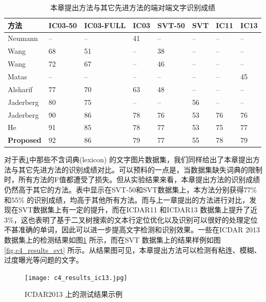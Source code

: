         \begin{table}[!h]
        \centering
        \caption{本章提出方法与其它先进方法的端对端文字识别成绩}
        \begin{tabular}{l|l l l l l l l}
        \hline
        方法 & IC03-50 & IC03-FULL & IC03 & SVT-50 & SVT & IC11 & IC13  \\
        \hline
        Neumann\cite{Neumann2010A} & -- & -- & 41 & -- & -- & -- & -- \\
        Wang\cite{Wang2012End} & 68 & 51 & -- & 38 & -- & -- & -- \\
        Wang\cite{Wang2012End} & 72 & 67 & -- & 46 & -- & -- & -- \\
        Matas\cite{Matas2014Scene} & -- & -- & -- & -- & -- & -- & 45 \\
        Alsharif\cite{Alsharif2013End} & 77 & 70 & 63 & 48 & -- & -- & -- \\
        Jaderberg\cite{Jaderberg2014Deep} & 80 & 75 & -- & -- & 56 & -- & -- \\
        Jaderberg\cite{Jaderberg2016Reading} & 90 & 86 & 78 & 76 & 53 & 76 & 76 \\
        He\cite{He2017scene} & 91 & 85 & 78 & 77 & 53 & 75 & 77 \\
        \textbf{Proposed} & 92 & 86 & 79 & 77 & 55 & 78 & 79 \\
        \hline
        \end{tabular}
        \label{tab.c4_recognition}
        \end{table}

        对于表\ref{tab.c4_recognition}中那些不含词典(lexicon) 的文字图片数据集，我们同样给出了本章提出方法与其它先进方法的识别成绩对比。可以预料的一点是，当数据集缺失词典的限制时，所有方法的F值都遭受了损失。但从实验结果来看，本章提出方法的识别成绩仍然高于其它的方法。表中显示在SVT-50和SVT数据集上，本方法分别获得77\%和55\% 的识别成绩，均高于其他所有方法。而与上一章提出的方法进行对比，发现在SVT数据集上有一定的提升，而在ICDAR11 和ICDAR13 数据集上提升了近3\%，这也表明了基于二叉树搜索的文本行定位优化以及识别可以很好的处理定位不甚准确的单词，因此可以进一步提高文字检测和识别效果。一些在ICDAR 2013数据集上的检测结果如图\ref{fig.c4_results_ic13} 所示，而在SVT 数据集上的结果样例如图\ref{fig.c4_results_svt} 所示。从结果图可见，本章提出方法可以检测有粘连、模糊、过度曝光等问题的文字。

        \begin{figure}[!h]
        \centering
        \texttt{[image: c4\_results\_ic13.jpg]}
        \caption{ICDAR2013 上的测试结果示例}
        \label{fig.c4_results_ic13}
        \end{figure}

